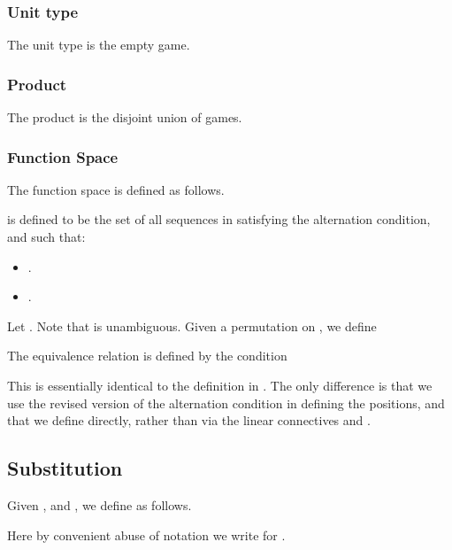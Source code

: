 \documentclass[a4paper,11pt]{article}
\begin{document}
\subsubsection*{Unit type}
The unit type  is the empty game.


\subsubsection*{Product}
The product  is the disjoint union of games.





\subsubsection*{Function Space}
The function space  is defined as follows.



\noindent  is defined to be the set of all sequences in
 satisfying the alternation condition, and
such that:
\begin{itemize}
\item .
\item .
\end{itemize}
Let . Note that
 is unambiguous. Given a permutation  on , we
define

The equivalence relation  is defined by
the condition

This is essentially identical to the definition in \cite{AJM00}. The
only difference is that we use the revised version of the alternation
condition in defining the positions, and that we define  directly, rather than via the linear connectives  and
.


\subsection{Substitution}

Given , and , we define
 as follows.





Here by convenient abuse of notation we write  for .
\end{document}
